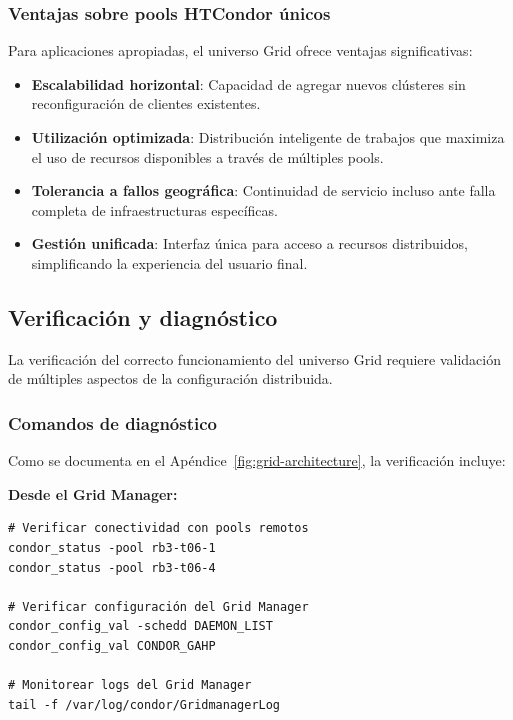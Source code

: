 \subsubsection{Ventajas sobre pools HTCondor únicos}
\noindent

Para aplicaciones apropiadas, el universo Grid ofrece ventajas significativas:

\begin{itemize}
	\item \textbf{Escalabilidad horizontal}: Capacidad de agregar nuevos clústeres sin reconfiguración de clientes existentes.
	
	\item \textbf{Utilización optimizada}: Distribución inteligente de trabajos que maximiza el uso de recursos disponibles a través de múltiples pools.
	
	\item \textbf{Tolerancia a fallos geográfica}: Continuidad de servicio incluso ante falla completa de infraestructuras específicas.
	
	\item \textbf{Gestión unificada}: Interfaz única para acceso a recursos distribuidos, simplificando la experiencia del usuario final.
\end{itemize}

\subsection{Verificación y diagnóstico}
\noindent

La verificación del correcto funcionamiento del universo Grid requiere validación de múltiples aspectos de la configuración distribuida.

\subsubsection{Comandos de diagnóstico}
\noindent

Como se documenta en el Apéndice~\ref{fig:grid-architecture}, la verificación incluye:

\textbf{Desde el Grid Manager:}

\begin{verbatim}
# Verificar conectividad con pools remotos
condor_status -pool rb3-t06-1
condor_status -pool rb3-t06-4

# Verificar configuración del Grid Manager
condor_config_val -schedd DAEMON_LIST
condor_config_val CONDOR_GAHP

# Monitorear logs del Grid Manager
tail -f /var/log/condor/GridmanagerLog
\end{verbatim}

